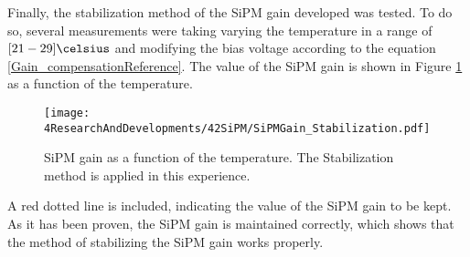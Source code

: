 Finally, the stabilization method of the SiPM gain developed was tested. To do so, several measurements were taking varying the temperature in a range of $[21-29]\celsius$ and modifying the bias voltage according to the equation \ref{Gain_compensationReference}. The value of the SiPM gain is shown in Figure \ref{fig:SiPMGainStabilization} as a function of the temperature.

\begin{figure}[hbtp]
\centering
\texttt{[image: 4ResearchAndDevelopments/42SiPM/SiPMGain\_Stabilization.pdf]}
\caption{SiPM gain as a function of the temperature. The Stabilization method is applied in this experience. \label{fig:SiPMGainStabilization}}
\end{figure}

A red dotted line is included, indicating the value of the SiPM gain to be kept. As it has been proven, the SiPM gain is maintained correctly, which shows that the method of stabilizing the SiPM gain works properly.